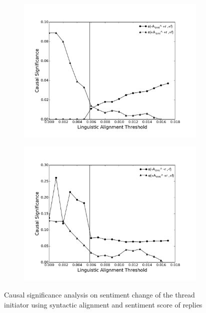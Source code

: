 \documentclass[man,biblatex,floatsintext]{apa6}
\begin{document}
\begin{figure}[!htb]
\begin{subfigure}{.5\textwidth}
  \centering
  \includegraphics[width=\linewidth]{Figures/posF05Syn20.pdf}
  \caption{\label{fig:posf05Syn}}
\end{subfigure}
\begin{subfigure}{.5\textwidth}
  \centering
  \includegraphics[width=\linewidth]{Figures/negF05Syn20.pdf}
  \caption{\label{fig:negf05Syn}}
\end{subfigure}
\caption{Causal significance analysis on sentiment change of the thread initiator using syntactic alignment and sentiment score of replies}
\label{fig:Robust_Syn}
\end{figure}
\end{document}
